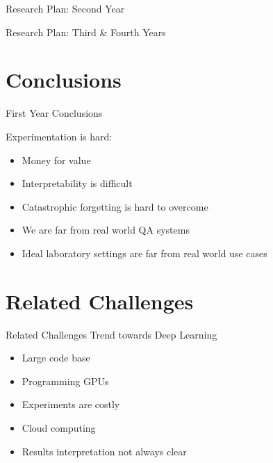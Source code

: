 \documentclass{beamer}
\begin{document}
\begin{frame}{Research Plan: Second Year}
\end{frame}

\begin{frame}{Research Plan: Third \& Fourth Years}
\end{frame}

\section{Conclusions}
\begin{frame}{First Year Conclusions}
  \begin{alertblock}{Experimentation is hard:}
    \begin{itemize}
      \item Money for value
      \item Interpretability is difficult
      \item Catastrophic forgetting is hard to overcome
      \item We are far from real world QA systems
      \item Ideal laboratory settings are far from real world use cases
    \end{itemize}
  \end{alertblock}
\end{frame}


\section{Related Challenges}
\begin{frame}{Related Challenges}
  \alert{\Large Trend towards Deep Learning}
  \begin{itemize}
    \item Large code base
    \item Programming GPUs
    \item Experiments are costly
    \item Cloud computing
    \item Results interpretation not always clear
  \end{itemize}
\end{frame}

\end{document}
